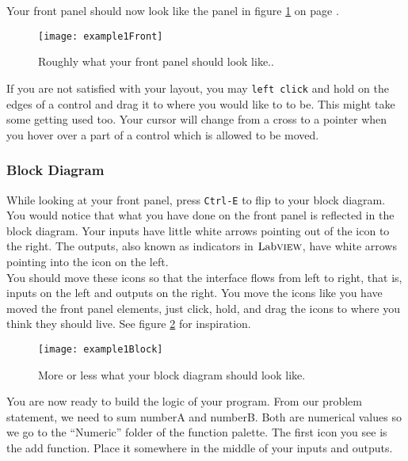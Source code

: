 	Your front panel should now look like the panel in figure \ref{example1Front} on page \pageref{example1Front}.\\
	\begin{figure}
		\centering
		\texttt{[image: example1Front]}
		\caption{Roughly what your front panel should look like..}
		\label{example1Front}
	\end{figure}
	
	If you are not satisfied with your layout, you may \texttt{left click} and hold on the edges of a control and drag it to where you would like to to be. This might take some getting used too. Your cursor will change from a cross to a pointer when you hover over a part of a control which is allowed to be moved. %
	\subsubsection{Block Diagram}
	While looking at your front panel, press \texttt{Ctrl-E} to flip to your block diagram. You would notice that what you have done on the front panel is reflected in the block diagram. Your inputs have little white arrows pointing out of the icon to the right. The outputs, also known as indicators in $\text{Lab}\textsc{view}$, have white arrows pointing into the icon on the left.\\
	
	You should move these icons so that the interface flows from left to right, that is, inputs on the left and outputs on the right. You move the icons like you have moved the front panel elements, just click, hold, and drag the icons to where you think they should live. See figure \ref{example1Block} for inspiration.\\
	\begin{figure}
		\centering
		\texttt{[image: example1Block]}
		\caption{More or less what your block diagram should look like.}
		\label{example1Block}
	\end{figure}

	You are now ready to build the logic of your program. From our problem statement, we need to sum numberA and numberB. Both are numerical values so we go to the ``Numeric'' folder of the function palette. The first icon you see is the add function. Place it somewhere in the middle of your inputs and outputs.\\
	
